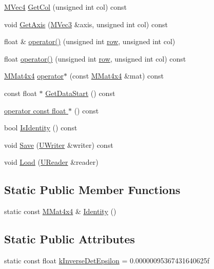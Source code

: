 \begin{CompactItemize}
\hyperlink{class_m_vec4}{MVec4} \hyperlink{class_m_mat4x4_6acc4e4a7706b2786b2e0fed62008eff}{GetCol} (unsigned int col) const 
\item 
void \hyperlink{class_m_mat4x4_a04d5d581a190e7449aff729d01ae5d4}{GetAxis} (\hyperlink{class_m_vec3}{MVec3} \&axis, unsigned int col) const 
\item 
float \& \hyperlink{class_m_mat4x4_c636eaea929506f008eed9bff65c3aca}{operator()} (unsigned int \hyperlink{glext__bak_8h_08e0b6bb56b39ff71be380b4cdf5ec33}{row}, unsigned int col)
\item 
float \hyperlink{class_m_mat4x4_e3f4c44e37d6715708f5ee7397d8f9b3}{operator()} (unsigned int \hyperlink{glext__bak_8h_08e0b6bb56b39ff71be380b4cdf5ec33}{row}, unsigned int col) const 
\item 
\hyperlink{class_m_mat4x4}{MMat4x4} \hyperlink{class_m_mat4x4_4dc496e3911853ba028cf38e4be38e33}{operator$\ast$} (const \hyperlink{class_m_mat4x4}{MMat4x4} \&mat) const 
\item 
const float $\ast$ \hyperlink{class_m_mat4x4_f024602a5e606751374a11f84a4809ce}{GetDataStart} () const 
\item 
\hyperlink{class_m_mat4x4_efc2d783f3d6384b87d7b8e3705b8e5f}{operator const float $\ast$} () const 
\item 
bool \hyperlink{class_m_mat4x4_4b4855dfac02d865ba6bad9a83f40dd0}{IsIdentity} () const 
\item 
void \hyperlink{class_m_mat4x4_51096a071af230f20fe4d5a94db23913}{Save} (\hyperlink{class_u_writer}{UWriter} \&writer) const 
\item 
void \hyperlink{class_m_mat4x4_3ca6c5ddab80f8b7eb30ec47f4f908c9}{Load} (\hyperlink{class_u_reader}{UReader} \&reader)
\end{CompactItemize}
\subsection*{Static Public Member Functions}
\begin{CompactItemize}
\item 
static const \hyperlink{class_m_mat4x4}{MMat4x4} \& \hyperlink{class_m_mat4x4_ea61fe6cd5a7fdea9260a96812a95298}{Identity} ()
\end{CompactItemize}
\subsection*{Static Public Attributes}
\begin{CompactItemize}
\item 
static const float \hyperlink{class_m_mat4x4_f023d028712e837f5150cfa1cffec3ad}{kInverseDetEpsilon} = 0.00000095367431640625f
\end{CompactItemize}


